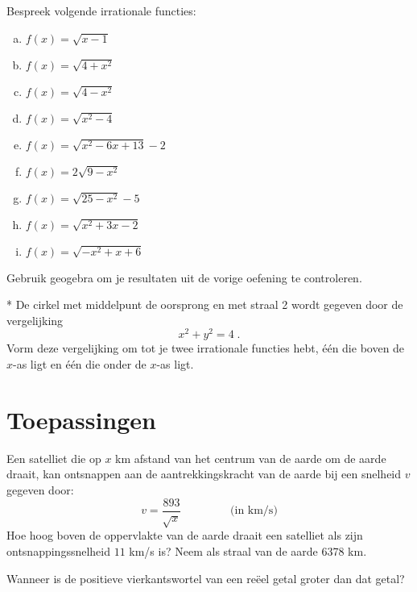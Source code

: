 \documentclass[12pt,twoside]{article}
\begin{document}
\begin{oefening}
Bespreek volgende irrationale functies:
\begin{enumerate}[(a)]
  \item $f(x)=\sqrt{x-1}$
  \item $f(x)=\sqrt{4+x^2}$
  \item $f(x)=\sqrt{4-x^2}$
  \item $f(x)=\sqrt{x^2-4}$
  \item $f(x)=\sqrt{x^2-6x+13}-2$
  \item $f(x)=2\sqrt{9-x^2}$
  \item $f(x)=\sqrt{25-x^2}-5$
  \item $f(x)=\sqrt{x^2+3x-2}$
  \item $f(x)=\sqrt{-x^2+x+6}$
\end{enumerate}
\end{oefening}

\begin{oefening}
Gebruik geogebra om je resultaten uit de vorige oefening te controleren.
\end{oefening}

\begin{oefening}*
De cirkel met middelpunt de oorsprong en met straal 2 wordt gegeven door de vergelijking
$$x^2+y^2=4\;.$$
Vorm deze vergelijking om tot je twee irrationale functies hebt, één die boven de $x$-as ligt en één die onder de $x$-as ligt.
\end{oefening}

\pagebreak
\section{Toepassingen}

\begin{oefening} %
Een satelliet die op $x$ km afstand van het centrum van de aarde om de aarde draait, kan ontsnappen aan de aantrekkingskracht van de aarde bij een snelheid $v$ gegeven door:
$$v=\dfrac{893}{\sqrt{x}}\qquad\qquad\mbox{ (in km/s)}$$
Hoe hoog boven de oppervlakte van de aarde draait een satelliet als zijn ontsnappingssnelheid $11$ km/s is? Neem als straal van de aarde 6378 km.
\end{oefening}

\begin{oefening} %
Wanneer is de positieve vierkantswortel van een reëel getal groter dan dat getal?
\end{oefening}
\end{document}
